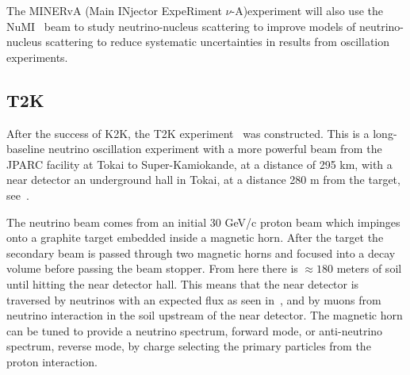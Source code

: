 The MINERvA (Main INjector ExpeRiment $\nu$-A)experiment \cite{39minerva} will also use the NuMI~\cite{19NuMI} beam to study neutrino-nucleus scattering to improve models of neutrino-nucleus scattering to reduce systematic uncertainties in results from oscillation experiments.


\subsection{T2K}


After the success of K2K, the T2K experiment~\cite{21T2K} was constructed. This is a long-baseline neutrino oscillation experiment with a more powerful beam from the JPARC facility at Tokai to Super-Kamiokande, at a distance of 295 km, with a near detector an underground hall in Tokai, at a distance 280 m from the target, see~.

The neutrino beam comes from an initial 30 GeV/c proton beam which impinges onto a graphite target embedded inside a magnetic horn. After the target the secondary beam is passed through two magnetic horns and focused into a decay volume before passing the beam stopper. From here there is $\approx180$ meters of soil until hitting the near detector hall. This means that the near detector is traversed by neutrinos with an expected flux as seen in~, and by muons from neutrino interaction in the soil upstream of the near detector. The magnetic horn can be tuned to provide a neutrino spectrum, forward mode, or anti-neutrino spectrum, reverse mode, by charge selecting the primary particles from the proton interaction.


